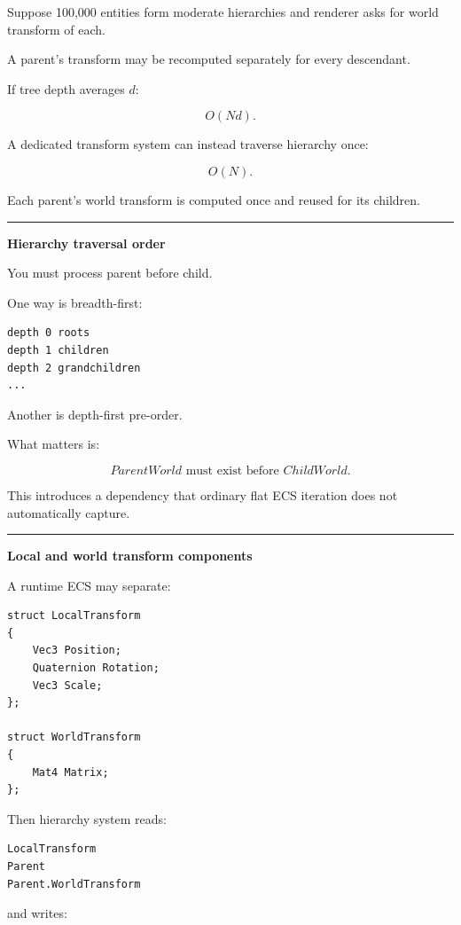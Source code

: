 Suppose 100,000 entities form moderate hierarchies and renderer asks for world transform of each.

A parent's transform may be recomputed separately for every descendant.

If tree depth averages \(d\):

\[
O(Nd).
\]

A dedicated transform system can instead traverse hierarchy once:

\[
O(N).
\]

Each parent's world transform is computed once and reused for its children.

\begin{center}\rule{0.5\linewidth}{0.5pt}\end{center}

\textbf{Hierarchy traversal order}

You must process parent before child.

One way is breadth-first:

\begin{verbatim}
depth 0 roots
depth 1 children
depth 2 grandchildren
...
\end{verbatim}

Another is depth-first pre-order.

What matters is:

\[
\boxed{
ParentWorld
\text{ must exist before }
ChildWorld.
}
\]

This introduces a dependency that ordinary flat ECS iteration does not automatically capture.

\begin{center}\rule{0.5\linewidth}{0.5pt}\end{center}

\textbf{Local and world transform components}

A runtime ECS may separate:

\begin{verbatim}
struct LocalTransform
{
    Vec3 Position;
    Quaternion Rotation;
    Vec3 Scale;
};

struct WorldTransform
{
    Mat4 Matrix;
};
\end{verbatim}

Then hierarchy system reads:

\begin{verbatim}
LocalTransform
Parent
Parent.WorldTransform
\end{verbatim}

and writes:

